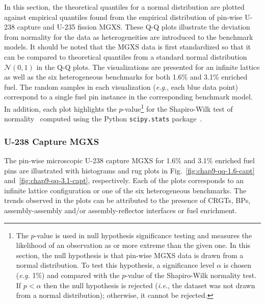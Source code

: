 In this section, the theoretical quantiles for a normal distribution are plotted against empirical quantiles found from the empirical distribution of pin-wise U-238 capture and U-235 fission \ac{MGXS}. These \ac{Q-Q} plots illustrate the deviation from normality for the data as heterogeneities are introduced to the benchmark models. It should be noted that the \ac{MGXS} data is first standardized so that it can be compared to theoretical quantiles from a standard normal distribution $\mathcal{N}(0,1)$ in the \ac{Q-Q} plots. The visualizations are presented for an infinite lattice as well as the six heterogeneous benchmarks for both 1.6\% and 3.1\% enriched fuel. The random samples in each visualization (\textit{e.g.}, each blue data point) correspond to a single fuel pin instance in the corresponding benchmark model. In addition, each plot highlights the $p$-value\footnote{The $p$-value is used in null hypothesis significance testing and measures the likelihood of an observation as or more extreme than the given one. In this section, the null hypothesis is that pin-wise \ac{MGXS} data is drawn from a normal distribution. To test this hypothesis, a significance level $\alpha$ is chosen (\textit{e.g.} 1\%) and compared with the $p$-value of the Shapiro-Wilk normality test. If $p < \alpha$ then the null hypothesis is rejected (\textit{i.e.}, the dataset was not drawn from a normal distribution); otherwise, it cannot be rejected.} for the Shapiro-Wilk test of normality~\cite{shapiro1965analysis} computed using the Python \texttt{scipy.stats} package~\cite{jones2011scipy}.

\subsubsection{U-238 Capture MGXS}
\label{subsubsec:chap9-qq-plots-capt}

The pin-wise microscopic U-238 capture \ac{MGXS} for 1.6\% and 3.1\% enriched fuel pins are illustrated with histograms and rug plots in Fig.~\ref{fig:chap9-qq-1.6-capt} and~\ref{fig:chap9-qq-3.1-capt}, respectively. Each of the plots corresponds to an infinite lattice configuration or one of the six heterogeneous benchmarks. The trends observed in the plots can be attributed to the presence of \acp{CRGT}, \acp{BP}, assembly-assembly and/or assembly-reflector interfaces or fuel enrichment. 

